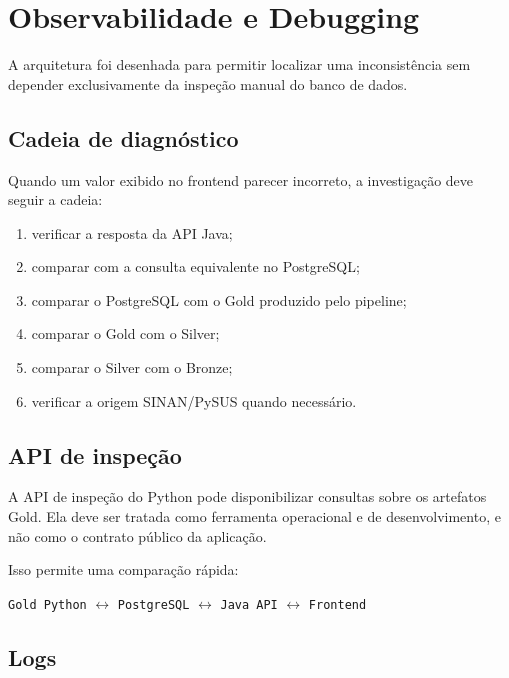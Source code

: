 \section{Observabilidade e Debugging}

A arquitetura foi desenhada para permitir localizar uma inconsistência sem depender exclusivamente da inspeção manual do banco de dados.

\subsection{Cadeia de diagnóstico}

Quando um valor exibido no frontend parecer incorreto, a investigação deve seguir a cadeia:

\begin{enumerate}
    \item verificar a resposta da API Java;
    \item comparar com a consulta equivalente no PostgreSQL;
    \item comparar o PostgreSQL com o Gold produzido pelo pipeline;
    \item comparar o Gold com o Silver;
    \item comparar o Silver com o Bronze;
    \item verificar a origem SINAN/PySUS quando necessário.
\end{enumerate}


\subsection{API de inspeção}

A API de inspeção do Python pode disponibilizar consultas sobre os artefatos Gold. Ela deve ser tratada como ferramenta operacional e de desenvolvimento, e não como o contrato público da aplicação.

Isso permite uma comparação rápida:

\begin{center}
\texttt{Gold Python} $\leftrightarrow$ \texttt{PostgreSQL} $\leftrightarrow$ \texttt{Java API} $\leftrightarrow$ \texttt{Frontend}
\end{center}

\subsection{Logs}

